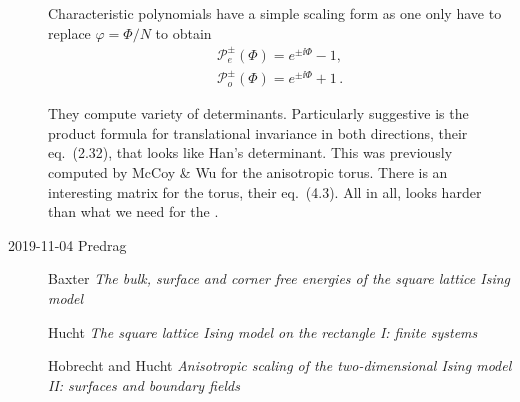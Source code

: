 \begin{description}
Characteristic polynomials  have a
simple scaling form as one only have to replace $\varphi=\Phi/N$ to
obtain
%
\begin{subequations}
\label{eq:CharacteristicPolynomials}
\begin{align}
	\mathcal{P}^{\pm}_{e}(\Phi)=e^{\pm\ii\Phi}-1,\\
	\mathcal{P}^{\pm}_{o}(\Phi)=e^{\pm\ii\Phi}+1
\,.
\end{align}
\end{subequations}
%

They compute variety of determinants. Particularly suggestive is the
product formula for translational invariance in both directions, their
eq.~(2.32), that looks like Han's determinant. This was previously
computed by McCoy \& Wu for the anisotropic torus.
There is an interesting matrix for the torus, their eq.~(4.3).
All in all, looks harder than what we need for the \catlatt.

\item[2019-11-04 Predrag]

Baxter {\em The bulk, surface and corner free energies of
the square lattice {Ising} model}

Hucht {\em The square lattice {Ising} model on the rectangle
{I}: finite systems}

Hobrecht and Hucht {\em
Anisotropic scaling of the two-dimensional {Ising} model {II}: surfaces
and boundary fields}

\end{description}

    \newpage

    \newpage


\printbibliography[heading=subbibintoc,title={References}]
